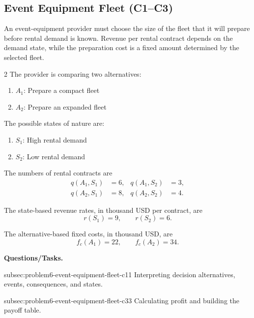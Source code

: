 
\subsection{Event Equipment Fleet (C1--C3)}
\label{sec:problem6-event-equipment-fleet-c1-c3}

An event-equipment provider must choose the size of the fleet that it will
prepare before rental demand is known. Revenue per rental contract depends on
the demand state, while the preparation cost is a fixed amount determined by
the selected fleet.

\begin{multicols}{2}
	The provider is comparing two alternatives:
	\begin{enumerate}[label=\arabic*.]
		\item \(A_1\): Prepare a compact fleet
		\item \(A_2\): Prepare an expanded fleet
	\end{enumerate}
	
	The possible states of nature are:
	\begin{enumerate}[label=\arabic*.]
		\item \(S_1\): High rental demand
		\item \(S_2\): Low rental demand
	\end{enumerate}
	
	\columnbreak
	
	The numbers of rental contracts are
	\[
	\begin{aligned}
		q(A_1,S_1)&=6,
		&
		q(A_1,S_2)&=3,
		\\
		q(A_2,S_1)&=8,
		&
		q(A_2,S_2)&=4.
	\end{aligned}
	\]
	
	The state-based revenue rates, in thousand USD per contract, are
	\[
	r(S_1)=9,
	\qquad
	r(S_2)=6.
	\]
	
	The alternative-based fixed costs, in thousand USD, are
	\[
	f_c(A_1)=22,
	\qquad
	f_c(A_2)=34.
	\]
\end{multicols}

\textbf{Questions/Tasks.}
\begin{enumerate}
	\CriterionTask
	{subsec:problem6-event-equipment-fleet-c1}{1}
	{Interpreting decision alternatives, events, consequences, and states.}

	\CriterionTask
	{subsec:problem6-event-equipment-fleet-c3}{3}
	{Calculating profit and building the payoff table.}
\end{enumerate}

